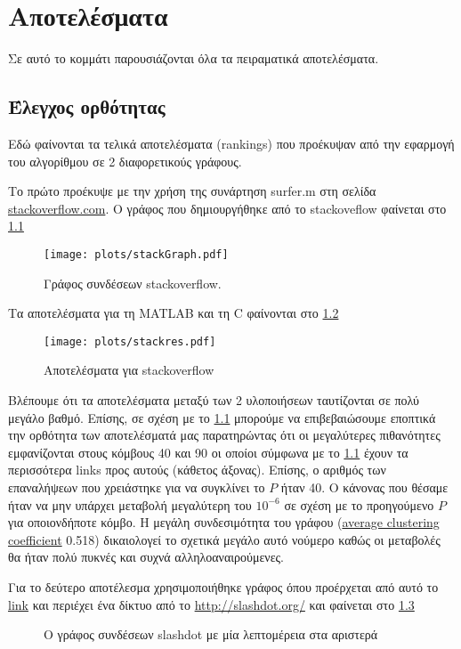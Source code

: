 \chapter{Αποτελέσματα}
Σε αυτό το κομμάτι παρουσιάζονται όλα τα πειραματικά αποτελέσματα.
\section{Έλεγχος ορθότητας}
Εδώ φαίνονται τα τελικά αποτελέσματα (rankings) που προέκυψαν από την εφαρμογή του αλγορίθμου σε 2 διαφορετικούς γράφους.

Το πρώτο προέκυψε με την χρήση της συνάρτηση surfer.m στη σελίδα \href{http://stackoverflow.com/}{stackoverflow.com}.
O γράφος που δημιουργήθηκε από το stackoveflow φαίνεται στο
\hyperref[fig:stackGraph]{\figurename{} \ref{fig:stackGraph}}
\begin{figure}[h]
	\centerline{\texttt{[image: plots/stackGraph.pdf]}}
	\caption{Γράφος συνδέσεων stackoverflow.}
	\label{fig:stackGraph}
\end{figure}
 
Τα αποτελέσματα για τη MATLAB και τη C φαίνονται στο \hyperref[fig:stackres]{\figurename{} \ref{fig:stackres}}
\begin{figure}[h]
	\centerline{\texttt{[image: plots/stackres.pdf]}}
	\caption{Αποτελέσματα για stackoverflow}
	\label{fig:stackres}
\end{figure}
 
Βλέπουμε ότι τα αποτελέσματα μεταξύ των 2 υλοποιήσεων ταυτίζονται σε πολύ μεγάλο βαθμό.
Επίσης, σε σχέση με το
\hyperref[fig:stackGraph]{\figurename{} \ref{fig:stackGraph}}
μπορούμε να επιβεβαιώσουμε  εποπτικά την ορθότητα των αποτελέσματά μας
παρατηρώντας ότι οι μεγαλύτερες πιθανότητες εμφανίζονται στους κόμβους 40 και 90
οι οποίοι  σύμφωνα με το 
\hyperref[fig:stackGraph]{\figurename{} \ref{fig:stackGraph}}
έχουν τα περισσότερα links προς αυτούς (κάθετος άξονας).
Επίσης, ο αριθμός των επαναλήψεων που χρειάστηκε για να συγκλίνει το $P$ ήταν 40.
Ο κάνονας που θέσαμε ήταν να μην υπάρχει μεταβολή μεγαλύτερη του $10^{-6}$ σε σχέση με το προηγούμενο $P$ για οποιονδήποτε κόμβο.
Η μεγάλη συνδεσιμότητα του γράφου
(\href{https://en.wikipedia.org/wiki/Clustering_coefficient#Global_clustering_coefficient}{average clustering coefficient} 0.518)
δικαιολογεί το σχετικά μεγάλο αυτό νούμερο καθώς οι μεταβολές θα ήταν πολύ πυκνές και συχνά αλληλοαναιρούμενες.

\newpage

Για το δεύτερο αποτέλεσμα χρησιμοποιήθηκε γράφος όπου προέρχεται από αυτό το
\href{http://snap.stanford.edu/data/soc-Slashdot0811.html}{link} 
και περιέχει ένα δίκτυο από το
\href{http://slashdot.org/}{http://slashdot.org/}
και φαίνεται στο
\hyperref[fig:slashGraph]{\figurename{} \ref{fig:slashGraph}}
\begin{figure}[h!]
	\centering
	\caption{O γράφος συνδέσεων slashdot με μία λεπτομέρεια στα αριστερά}
	\label{fig:slashGraph}
\end{figure}

